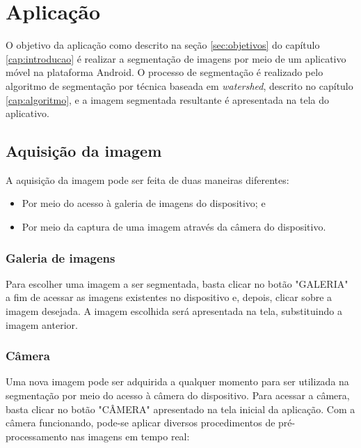 \chapter{Aplicação}\label{cap:aplicacao}

O objetivo da aplicação como descrito na seção \ref{sec:objetivos} do capítulo \ref{cap:introducao} é realizar a segmentação de imagens por meio de um aplicativo móvel na plataforma Android.
O processo de segmentação é realizado pelo algoritmo de segmentação por técnica baseada em \textit{watershed}, descrito no capítulo \ref{cap:algoritmo}, e a imagem segmentada resultante é apresentada na tela do aplicativo.

\section{Aquisição da imagem}\label{sec:aquisicao_aplicacao}

A aquisição da imagem pode ser feita de duas maneiras diferentes: 

\begin{itemize}
    \item Por meio do acesso à galeria de imagens do dispositivo; e
    \item Por meio da captura de uma imagem através da câmera do dispositivo.
\end{itemize}

\subsection{Galeria de imagens}

Para escolher uma imagem a ser segmentada, basta clicar no botão "GALERIA" a fim de acessar as imagens existentes no dispositivo e, depois, clicar sobre a imagem desejada.
A imagem escolhida será apresentada na tela, substituindo a imagem anterior.

\subsection{Câmera}

Uma nova imagem pode ser adquirida a qualquer momento para ser utilizada na segmentação por meio do acesso à câmera do dispositivo. Para acessar a câmera, basta clicar no botão "CÂMERA" apresentado na tela inicial da aplicação.
Com a câmera funcionando, pode-se aplicar diversos procedimentos de pré-processamento nas imagens em tempo real:

